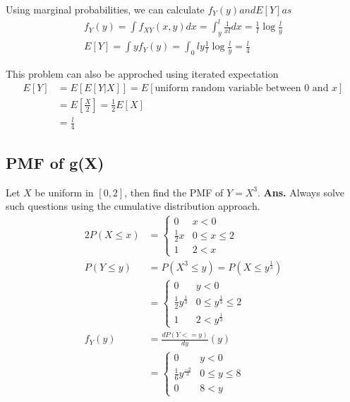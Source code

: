 \documentclass[11pt, a4paper]{article}
\begin{document}
    Using marginal probabilities, we can calculate $f_{Y}(y) and E[Y] as$
    \begin{align*}
        f_{Y}(y) = \int f_{XY}(x,y) dx = \int_{y}^{l} \frac{1}{xl} dx = \frac{1}{l} \log \frac{l}{y} \tag*{Note that for any $y$, $y \leq x \leq l$}\\
        E[Y] = \int y f_{Y}(y) = \int_{0}{l} y \frac{1}{l} \log\frac{l}{y} = \frac{l}{4}
    \end{align*}

    This problem can also be approched using iterated expectation
    \begin{align*}
        E[Y] &= E[E[Y|X]] = E[\text{uniform random variable between $0$ and $x$}]\\
            &= E[\frac{X}{2}] =\frac{1}{2}E[X]\\
            &= \frac{l}{4} 
    \end{align*}

    \subsection{PMF of g(X)}
    Let $X$ be uniform in $[0, 2]$, then find the PMF of $Y = X^{3}$. \newline \newline
    \textbf{Ans.} Always solve such questions using the cumulative distribution approach.
    \begin{alignat*}{2}
        P(X \leq x) &= \begin{cases} 0 &\mbox{$x < 0$}\\
                                    \frac{1}{2} x &\mbox{$0 \leq x \leq 2$}\\
                                    1 &\mbox{$2 < x$} \end{cases}\\
        P(Y \leq y) &= P(X^{3} \leq y) = P(X \leq y^{\frac{1}{3}})\\
                    &= \begin{cases}  0 &\mbox{$y < 0$}\\
                                        \frac{1}{2} y^{\frac{1}{3}} &\mbox{$0 \leq y^{\frac{1}{3}} \leq 2$}\\
                                        1 &\mbox{$2 < y^{\frac{1}{3}}$} \end{cases}\\
        f_{Y}(y) &= \frac{dP(Y <= y)}{dy}(y)\\
                 &= \begin{cases}  0 &\mbox{$y < 0$}\\
                                        \frac{1}{6} y^{\frac{-2}{3}} &\mbox{$0 \leq y \leq 8$}\\
                                        0 &\mbox{$8 < y$} \end{cases}
    \end{alignat*}
\end{document}

